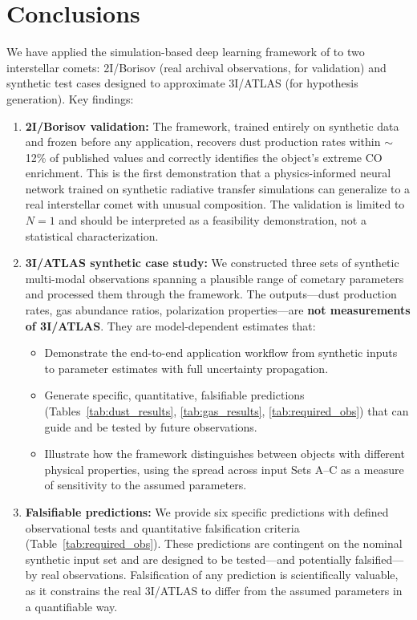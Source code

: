 \documentclass[usenatbib]{mnras}
\begin{document}
\section{Conclusions}\label{sec:conclusions}

We have applied the simulation-based deep learning framework of \citet{paperI} to two interstellar comets: 2I/Borisov (real archival observations, for validation) and synthetic test cases designed to approximate 3I/ATLAS (for hypothesis generation). Key findings:

\begin{enumerate}
    \item \textbf{2I/Borisov validation:} The framework, trained entirely on synthetic data and frozen before any application, recovers dust production rates within $\sim$12\% of published values and correctly identifies the object's extreme CO enrichment. This is the first demonstration that a physics-informed neural network trained on synthetic radiative transfer simulations can generalize to a real interstellar comet with unusual composition. The validation is limited to $N=1$ and should be interpreted as a feasibility demonstration, not a statistical characterization.

    \item \textbf{3I/ATLAS synthetic case study:} We constructed three sets of synthetic multi-modal observations spanning a plausible range of cometary parameters and processed them through the framework. The outputs---dust production rates, gas abundance ratios, polarization properties---are \textbf{not measurements of 3I/ATLAS}. They are model-dependent estimates that:
    \begin{itemize}
        \item Demonstrate the end-to-end application workflow from synthetic inputs to parameter estimates with full uncertainty propagation.
        \item Generate specific, quantitative, falsifiable predictions (Tables~\ref{tab:dust_results}, \ref{tab:gas_results}, \ref{tab:required_obs}) that can guide and be tested by future observations.
        \item Illustrate how the framework distinguishes between objects with different physical properties, using the spread across input Sets A--C as a measure of sensitivity to the assumed parameters.
    \end{itemize}

    \item \textbf{Falsifiable predictions:} We provide six specific predictions with defined observational tests and quantitative falsification criteria (Table~\ref{tab:required_obs}). These predictions are contingent on the nominal synthetic input set and are designed to be tested---and potentially falsified---by real observations. Falsification of any prediction is scientifically valuable, as it constrains the real 3I/ATLAS to differ from the assumed parameters in a quantifiable way.


\end{enumerate}
\end{document}
